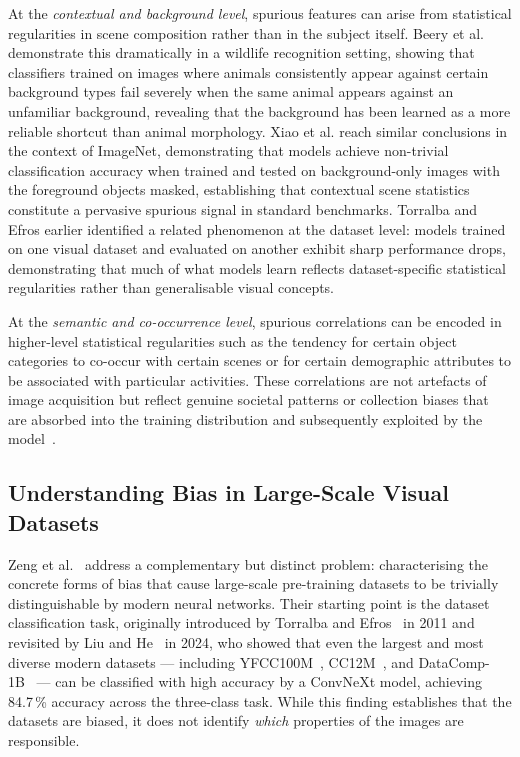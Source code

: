 At the \emph{contextual and background level}, spurious features can arise from statistical
regularities in scene composition rather than in the subject itself.  Beery et
al. \cite{Beery_2018_RecognitionTerraIncognita} demonstrate this dramatically in a wildlife
recognition setting, showing that classifiers trained on images where animals consistently
appear against certain background types fail severely when the same animal appears against
an unfamiliar background, revealing that the background has been learned as a more reliable
shortcut than animal morphology.  Xiao et al. \cite{Xiao_2021_NoiseOrSignal} reach similar
conclusions in the context of ImageNet, demonstrating that models achieve non-trivial
classification accuracy when trained and tested on background-only images with the foreground
objects masked, establishing that contextual scene statistics constitute a pervasive spurious
signal in standard benchmarks.  Torralba and Efros \cite{Torralba_2011_UnbiasedLookDatasetBias}
earlier identified a related phenomenon at the dataset level: models trained on one visual
dataset and evaluated on another exhibit sharp performance drops, demonstrating that much of
what models learn reflects dataset-specific statistical regularities rather than
generalisable visual concepts.

At the \emph{semantic and co-occurrence level}, spurious correlations can be encoded in
higher-level statistical regularities such as the tendency for certain object categories to
co-occur with certain scenes or for certain demographic attributes to be associated with
particular activities.  These correlations are not artefacts of image acquisition but reflect
genuine societal patterns or collection biases that are absorbed into the training distribution
and subsequently exploited by the model~\cite{Zhao_2017_MenAlsoLikeShopping}.

\subsection*{Understanding Bias in Large-Scale Visual Datasets}
\label{subsec:zeng2024}

Zeng et al.~\cite{Zeng_2024_UnderstandingBiasinLargeScaleVisualDatasets} address a
complementary but distinct problem: characterising the concrete forms of bias that cause
large-scale pre-training datasets to be trivially distinguishable by modern neural networks.
Their starting point is the dataset classification task, originally introduced by Torralba and
Efros~\cite{Torralba_2011_UnbiasedLookDatasetBias} in 2011 and revisited by Liu and
He~\cite{Liu_2024_DecadeBattleDatasetBias} in 2024, who showed that even the largest and
most diverse modern datasets --- including YFCC100M~\cite{Thomee_2016_YFCC100M},
CC12M~\cite{Changpinyo_2021_CC12M}, and DataComp-1B~\cite{Gadre_2023_DataComp} --- can be
classified with high accuracy by a ConvNeXt model, achieving 84.7\,\% accuracy across the
three-class task.  While this finding establishes that the datasets are biased, it does not
identify \emph{which} properties of the images are responsible.

